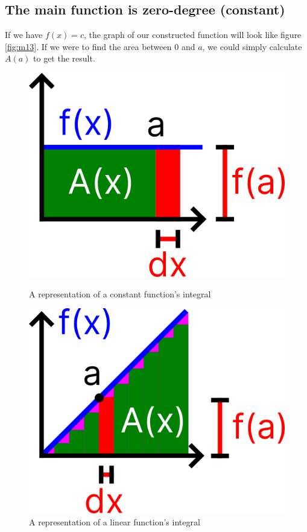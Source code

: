 \subsection{The main function is zero-degree (constant)}
If we have $f(x)=c$, the graph of our constructed function will look like figure \ref{fig:m13}. If we were to find the area between $0$ and $a$, we could simply calculate $A(a)$ to get the result.
\begin{figure}
    \centering
    \begin{minipage}{.4\textwidth}
        \centering
        \includegraphics[width=0.9\linewidth]{math/13.png}
        \caption{A representation of a constant function's integral}
        \label{fig:m13}
    \end{minipage}
    \begin{minipage}{.4\textwidth}
        \centering
        \includegraphics[width=0.9\linewidth]{math/14.png}
        \caption{A representation of a linear function's integral}
        \label{fig:m14}
    \end{minipage}
\end{figure}

